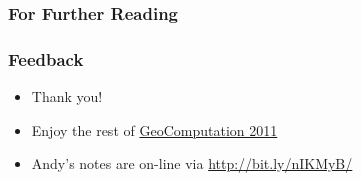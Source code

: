 \documentclass{beamer}
\begin{document}
\begin{frame}[allowframebreaks]
\frametitle<presentation>{For Further Reading}    

\end{frame}

\begin{frame}[t]
\frametitle{Feedback}
\begin{itemize}
  \item Thank you!
  \item Enjoy the rest of \href{http://standard.cege.ucl.ac.uk/workshops/Geocomputation/}{GeoComputation 2011}
  \item Andy's notes are on-line via \href{http://bit.ly/nIKMyB}{http://bit.ly/nIKMyB/}
\end{itemize}
\end{frame}
\end{document}
